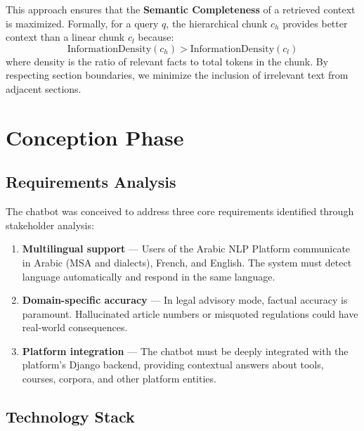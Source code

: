 \documentclass[12pt, a4paper]{article}
\begin{document}
This approach ensures that the \textbf{Semantic Completeness} of a retrieved
context is maximized. Formally, for a query $q$, the hierarchical chunk
$c_h$ provides better context than a linear chunk $c_l$ because:
\begin{equation}
  \text{InformationDensity}(c_h) > \text{InformationDensity}(c_l)
\end{equation}
where density is the ratio of relevant facts to total tokens in the chunk.
By respecting section boundaries, we minimize the inclusion of irrelevant
text from adjacent sections.


\section{Conception Phase}

\subsection{Requirements Analysis}

The chatbot was conceived to address three core requirements identified
through stakeholder analysis:

\begin{enumerate}[leftmargin=2em]
  \item \textbf{Multilingual support} --- Users of the Arabic NLP Platform
        communicate in Arabic (MSA and dialects), French, and English. The
        system must detect language automatically and respond in the same
        language.
  \item \textbf{Domain-specific accuracy} --- In legal advisory mode,
        factual accuracy is paramount. Hallucinated article numbers or
        misquoted regulations could have real-world consequences.
  \item \textbf{Platform integration} --- The chatbot must be deeply
        integrated with the platform's Django backend, providing contextual
        answers about tools, courses, corpora, and other platform entities.
\end{enumerate}

\subsection{Technology Stack}
\end{document}

